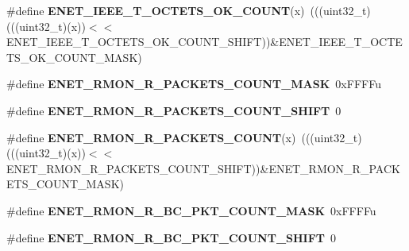 \begin{DoxyCompactItemize}
\item 
\#define {\bfseries E\+N\+E\+T\+\_\+\+I\+E\+E\+E\+\_\+\+T\+\_\+\+O\+C\+T\+E\+T\+S\+\_\+\+O\+K\+\_\+\+C\+O\+U\+NT}(x)~(((uint32\+\_\+t)(((uint32\+\_\+t)(x))$<$$<$E\+N\+E\+T\+\_\+\+I\+E\+E\+E\+\_\+\+T\+\_\+\+O\+C\+T\+E\+T\+S\+\_\+\+O\+K\+\_\+\+C\+O\+U\+N\+T\+\_\+\+S\+H\+I\+FT))\&E\+N\+E\+T\+\_\+\+I\+E\+E\+E\+\_\+\+T\+\_\+\+O\+C\+T\+E\+T\+S\+\_\+\+O\+K\+\_\+\+C\+O\+U\+N\+T\+\_\+\+M\+A\+SK)\hypertarget{group__ENET__Register__Masks_ga69bb269ecd63f2cf3d274f4e3bcccb9f}{}\label{group__ENET__Register__Masks_ga69bb269ecd63f2cf3d274f4e3bcccb9f}

\item 
\#define {\bfseries E\+N\+E\+T\+\_\+\+R\+M\+O\+N\+\_\+\+R\+\_\+\+P\+A\+C\+K\+E\+T\+S\+\_\+\+C\+O\+U\+N\+T\+\_\+\+M\+A\+SK}~0x\+F\+F\+F\+Fu\hypertarget{group__ENET__Register__Masks_gaffeecf969d5f86c7d84c936ea078e859}{}\label{group__ENET__Register__Masks_gaffeecf969d5f86c7d84c936ea078e859}

\item 
\#define {\bfseries E\+N\+E\+T\+\_\+\+R\+M\+O\+N\+\_\+\+R\+\_\+\+P\+A\+C\+K\+E\+T\+S\+\_\+\+C\+O\+U\+N\+T\+\_\+\+S\+H\+I\+FT}~0\hypertarget{group__ENET__Register__Masks_gaf03a05af7b6a3435e843eef9f55d8bba}{}\label{group__ENET__Register__Masks_gaf03a05af7b6a3435e843eef9f55d8bba}

\item 
\#define {\bfseries E\+N\+E\+T\+\_\+\+R\+M\+O\+N\+\_\+\+R\+\_\+\+P\+A\+C\+K\+E\+T\+S\+\_\+\+C\+O\+U\+NT}(x)~(((uint32\+\_\+t)(((uint32\+\_\+t)(x))$<$$<$E\+N\+E\+T\+\_\+\+R\+M\+O\+N\+\_\+\+R\+\_\+\+P\+A\+C\+K\+E\+T\+S\+\_\+\+C\+O\+U\+N\+T\+\_\+\+S\+H\+I\+FT))\&E\+N\+E\+T\+\_\+\+R\+M\+O\+N\+\_\+\+R\+\_\+\+P\+A\+C\+K\+E\+T\+S\+\_\+\+C\+O\+U\+N\+T\+\_\+\+M\+A\+SK)\hypertarget{group__ENET__Register__Masks_ga6564e8eb4dfe2940b5233b17edea14a4}{}\label{group__ENET__Register__Masks_ga6564e8eb4dfe2940b5233b17edea14a4}

\item 
\#define {\bfseries E\+N\+E\+T\+\_\+\+R\+M\+O\+N\+\_\+\+R\+\_\+\+B\+C\+\_\+\+P\+K\+T\+\_\+\+C\+O\+U\+N\+T\+\_\+\+M\+A\+SK}~0x\+F\+F\+F\+Fu\hypertarget{group__ENET__Register__Masks_gaea4e90fb7dfef377bdfbd1ec0591c1a9}{}\label{group__ENET__Register__Masks_gaea4e90fb7dfef377bdfbd1ec0591c1a9}

\item 
\#define {\bfseries E\+N\+E\+T\+\_\+\+R\+M\+O\+N\+\_\+\+R\+\_\+\+B\+C\+\_\+\+P\+K\+T\+\_\+\+C\+O\+U\+N\+T\+\_\+\+S\+H\+I\+FT}~0\hypertarget{group__ENET__Register__Masks_gaaadc28d495f1451106da4fcb1e2833ea}{}\label{group__ENET__Register__Masks_gaaadc28d495f1451106da4fcb1e2833ea}


\end{DoxyCompactItemize}

